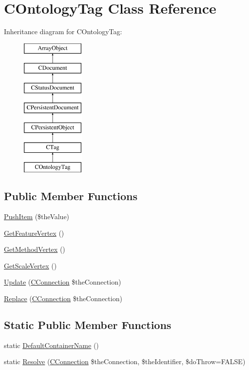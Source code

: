 \hypertarget{class_c_ontology_tag}{\section{C\-Ontology\-Tag Class Reference}
\label{class_c_ontology_tag}
}
Inheritance diagram for C\-Ontology\-Tag\-:\begin{figure}[H]
\begin{center}
\leavevmode
\includegraphics[height=7.000000cm]{class_c_ontology_tag}
\end{center}
\end{figure}
\subsection*{Public Member Functions}
\begin{DoxyCompactItemize}
\item 
\hyperlink{class_c_ontology_tag_a45c4c0a6da476d700c8197d77be016f8}{Push\-Item} (\$the\-Value)
\item 
\hyperlink{class_c_ontology_tag_a6f6ab6398a55f25e2860bac885f7f814}{Get\-Feature\-Vertex} ()
\item 
\hyperlink{class_c_ontology_tag_aa26d8df12c96f1018e3542303ba6ed1f}{Get\-Method\-Vertex} ()
\item 
\hyperlink{class_c_ontology_tag_acbbea165aff630988cb30c069b97dfc5}{Get\-Scale\-Vertex} ()
\item 
\hyperlink{class_c_ontology_tag_ae5aaf4673b9384c0bacbdc0b3cb2b1c8}{Update} (\hyperlink{class_c_connection}{C\-Connection} \$the\-Connection)
\item 
\hyperlink{class_c_ontology_tag_a878c491b0bb9f60c26c48a3797df15b8}{Replace} (\hyperlink{class_c_connection}{C\-Connection} \$the\-Connection)
\end{DoxyCompactItemize}
\subsection*{Static Public Member Functions}
\begin{DoxyCompactItemize}
\item 
static \hyperlink{class_c_ontology_tag_aba44e3b95b1e1830766f9647a2ea5f70}{Default\-Container\-Name} ()
\item 
static \hyperlink{class_c_ontology_tag_a58669fac5e450f687de2d4aad38bd4c4}{Resolve} (\hyperlink{class_c_connection}{C\-Connection} \$the\-Connection, \$the\-Identifier, \$do\-Throw=F\-A\-L\-S\-E)
\end{DoxyCompactItemize}
